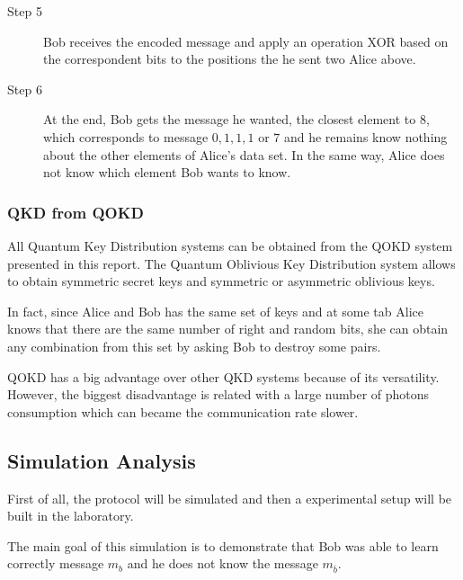 \begin{description}
  \item[Step 5] Bob receives the encoded message and apply an operation XOR based on the correspondent bits to the positions the he sent two Alice above.
  
  \item[Step 6] At the end, Bob gets the message he wanted, the closest element to $8$, which corresponds to message ${0,1,1,1}$ or $7$ and he remains know nothing about the other elements of Alice's data set. In the same way, Alice does not know which element Bob wants to know.
\end{description}


\subsubsection{QKD from QOKD}

All Quantum Key Distribution systems can be obtained from the QOKD system presented in this report. The Quantum Oblivious Key Distribution system allows to obtain symmetric secret keys and symmetric or asymmetric oblivious keys.

In fact, since Alice and Bob has the same set of keys and at some tab Alice knows that there are the same number of right and random bits, she can obtain any combination from this set by asking Bob to destroy some pairs. 

QOKD has a big advantage over other QKD systems because of its versatility. However, the biggest disadvantage is related with a large number of photons consumption which can became the communication rate slower.


\subsection{Simulation Analysis}

First of all, the protocol will be simulated and then a experimental setup will be built in the laboratory.

The main goal of this simulation is to demonstrate that Bob was able to learn correctly message $m_{b}$ and he does not know the message $m_{\overline{b}}$.

